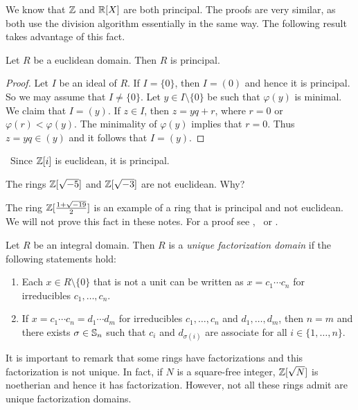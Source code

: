 We know that $\mathbb{Z}$ and $\mathbb{R}[X]$ are both principal. The proofs 
are very similar, as both use the division algorithm essentially in the same way. 
The following result takes advantage of this fact. 

\begin{proposition}
	Let $R$ be a euclidean domain. Then $R$ is principal.	
\end{proposition}

\begin{proof}
	Let $I$ be an ideal of $R$. If $I=\{0\}$, then $I=(0)$ and hence 
	it is principal. So we may
	assume that $I\ne\{0\}$. Let $y\in I\setminus\{0\}$ be such that
	$\varphi(y)$ is minimal. We claim that $I=(y)$. 
	If $z\in I$, then $z=yq+r$, where $r=0$ or $\varphi(r)<\varphi(y)$. 
	The minimality of $\varphi(y)$ implies that $r=0$. Thus $z=yq\in (y)$ and 
	it follows that 
	$I=(y)$. 
\end{proof}

\begin{example}\
	Since $\mathbb{Z}[i]$ is euclidean, it is principal.
\end{example}
 
\begin{example}
	The rings $\mathbb{Z}[\sqrt{-5}]$ and $\mathbb{Z}[\sqrt{-3}]$ are
	not euclidean. Why?
\end{example}

The ring $\mathbb{Z}[\frac{1+\sqrt{-19}}{2}]$ is an 
example of a ring that is principal and not euclidean. We will not prove this
fact in these notes. For a proof 
see \cite{MR967349}, \cite{MR3665445} or \cite{MR314831}.

\begin{definition}
	Let $R$ be an integral domain. Then $R$ is a 
	\emph{unique factorization domain}
	if the following statements hold:
	\begin{enumerate}
	\item Each $x\in R\setminus\{0\}$ that is not a unit can be written as $x=c_1\cdots c_n$ for irreducibles $c_1,\dots,c_n$. 
	\item If $x=c_1\cdots c_n=d_1\cdots d_m$ for irreducibles $c_1,\dots,c_n$ and $d_1,\dots,d_m$, then $n=m$ and there exists $\sigma\in\mathbb{S}_n$ such that $c_i$ and $d_{\sigma(i)}$ are
		associate for all $i\in\{1,\dots,n\}$. 
	\end{enumerate}
\end{definition}

It is important to remark that some rings 
have factorizations and this factorization is not unique. 
In fact, if $N$ is a square-free integer, $\mathbb{Z}[\sqrt{N}]$ is noetherian and hence it   
has factorization. 
However, not all these rings admit are unique factorization domains. 

